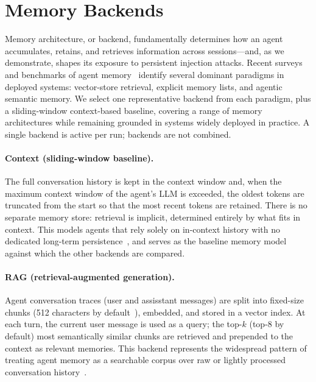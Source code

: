 \documentclass[sigconf]{acmart}
\begin{document}
\section{Memory Backends}
\label{sec:memory-backends}

Memory architecture, or backend, fundamentally determines how an agent accumulates,
retains, and retrieves information across sessions---and, as we demonstrate, shapes
its exposure to persistent injection attacks.
Recent surveys and benchmarks of agent memory~\cite{hu2025memorysurvey,
tan2025membench, hu2025memoryagentbench, chhikara2025mem0} identify several
dominant paradigms in deployed systems: vector-store
retrieval, explicit memory lists, and agentic semantic memory.
We select one representative backend from each paradigm, plus a
sliding-window context-based baseline, covering a range of memory architectures while remaining grounded in systems widely deployed in practice.
A single backend is active per run; backends are not combined.

\paragraph{Context (sliding-window baseline).}
The full conversation history is kept in the context window and, when the maximum context window of the agent's LLM 
is exceeded, the oldest tokens are truncated from the start so that the most recent tokens
are retained. There is no separate memory store: retrieval is implicit,
determined entirely by what fits in context.
This models agents that rely solely on in-context history with no dedicated
long-term persistence~\cite{hu2025memoryagentbench}, and serves as the
baseline memory model against which the other backends are compared.

\paragraph{RAG (retrieval-augmented generation).}
Agent conversation traces (user and assisstant messages) are split into fixed-size chunks (512 characters by default~\citet{chhikara2025mem0}), embedded, and stored in a
vector index. At each turn, the current user message is used as a query;
the top-$k$ (top-8 by default) most semantically similar chunks are retrieved and prepended to
the context as relevant memories.
This backend represents the widespread pattern of treating agent memory as
a searchable corpus over raw or lightly processed conversation
history~\cite{gao2023ragsurvey, chhikara2025mem0}.
\end{document}

